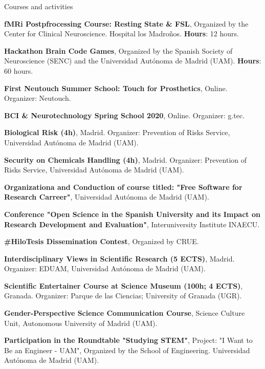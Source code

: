 \begin{rubric}{Courses and activities}

\entry*[February 2024] \textbf{fMRi Postpfrocessing Course: Resting State \& FSL}, Organized by the Center for Clinical Neuroscience. Hospital los Madroños. \textbf{Hours}: 12 hours.

\entry*[October 2021] \textbf{Hackathon Brain Code Games}, Organized by the Spanish Society of Neuroscience (SENC) and the Universidad Autónoma de Madrid (UAM). \textbf{Hours}: 60 hours.

\entry*[October 2020] \textbf{First Neutouch Summer School: Touch for Prosthetics}, Online. Organizer: Neutouch.

\entry*[April 2020] \textbf{BCI \& Neurotechnology Spring School 2020}, Online. Organizer: g.tec.


 \entry*[June 18, 2019] \textbf{Biological Risk (4h)}, Madrid. Organizer: Prevention of Risks Service, Universidad Autónoma de Madrid (UAM).

 \entry*[July 4, 2019] \textbf{Security on Chemicals Handling (4h)}, Madrid. Organizer: Prevention of Risks Service, Universidad Autónoma de Madrid (UAM).



\entry*[March 4,11, 2024] \textbf{Organizationa and Conduction of course titled: "Free Software for Research Carreer"}, Universidad Autónoma de Madrid (UAM).

\entry*[January 25, 2023] \textbf{Conference "Open Science in the Spanish University and its Impact on Research Development and Evaluation"}, Interuniversity Institute INAECU.

\entry*[May 2021] \textbf{\#HiloTesis Dissemination Contest}, Organized by CRUE.

 \textbf{Interdisciplinary Views in Scientific Research (5 ECTS)}, Madrid. Organizer: EDUAM, Universidad Autónoma de Madrid (UAM).

 \textbf{Scientific Entertainer Course at Science Museum (100h; 4 ECTS)}, Granada. Organizer: Parque de las Ciencias; University of Granada (UGR).

\entry*[February 2024] \textbf{Gender-Perspective Science Communication Course}, Science Culture Unit, Autonomous University of Madrid (UAM).

\entry*[June 2022] \textbf{Participation in the Roundtable "Studying STEM"}, Project: "I Want to Be an Engineer - UAM", Organized by the School of Engineering. Universidad Autónoma de Madrid (UAM).


\end{rubric}
